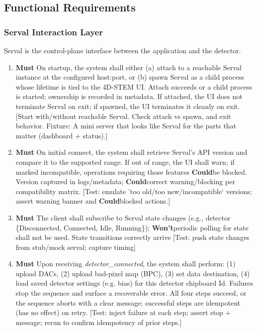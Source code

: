 \documentclass[12pt]{article}
\newcommand{\PriorityTag}[2]{%
  \colorbox{#2!25}{\footnotesize\textsf{\textbf{#1}}}\hspace{0.6em}}
\newcommand{\must}{\leavevmode\PriorityTag{Must}{green}}
\newcommand{\could}{\leavevmode\PriorityTag{Could}{cyan}}
\newcommand{\wont}{\leavevmode\PriorityTag{Won't}{red}}
\newcounter{reqgrp}[section] %
\newcounter{reqno}
\newcommand{\reqprefix}{GEN}
\newenvironment{requirements}[1]{%
  \renewcommand{\reqprefix}{#1}%
  \refstepcounter{reqgrp}%
  \setcounter{reqno}{0}%
  \begin{enumerate}[leftmargin=*]
}{\end{enumerate}}
\begin{document}
\subsection{Functional Requirements}

\subsubsection{Serval Interaction Layer}
Serval is the control-plane interface between the application and the detector.

\begin{requirements}{SRV}

\item \must {}
  {On startup, the system shall either (a) attach to a reachable Serval instance at the configured host:port, or (b) spawn Serval as a child process whose lifetime is tied to the 4D-STEM UI.}
  {Attach succeeds or a child process is started; ownership is recorded in metadata. If attached, the UI does not terminate Serval on exit; if spawned, the UI terminates it cleanly on exit.}
  [Start with/without reachable Serval. Check attach vs spawn, and exit behavior. Fixture: A mini server that looks like Serval for the parts that matter (dashboard + status).]

\item \must {}
  {On initial connect, the system shall retrieve Serval's API version and compare it to the supported range. If out of range, the UI shall warn; if marked incompatible, operations requiring those features \could be blocked.}
  {Version captured in logs/metadata; \could correct warning/blocking per compatibility matrix.}
  [Test: emulate 'too old/too new/incompatible` versions; assert warning banner and \could blocked actions.]

\item \must {}
  {The client shall subscribe to Serval state changes (e.g., detector \{Disconnected, Connected, Idle, Running\}); \wont periodic polling for state shall not be used.}
  {State transitions correctly arrive}
  [Test: push state changes from stub/mock serval; capture timing]

\item \must {}
  {Upon receiving \emph{detector\_connected}, the system shall perform: (1) upload DACs, (2) upload bad-pixel map (BPC), (3) set data destination, (4) load saved detector settings (e.g. bias) for this detector chipboard Id. Failures stop the sequence and surface a recoverable error.}
  {All four steps succeed, or the sequence aborts with a clear message; successful steps are idempotent (has no effect) on retry.}
  [Test: inject failure at each step; assert stop + message; rerun to confirm idempotency of prior steps.]


\end{requirements}
\end{document}
